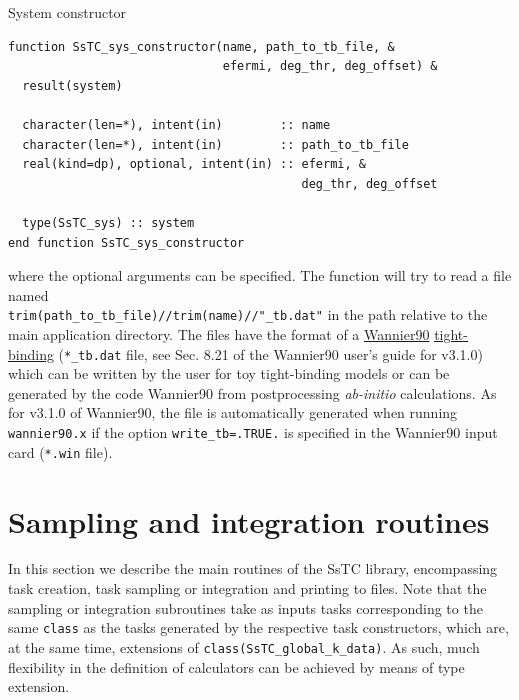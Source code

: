 \documentclass[10pt,a4paper]{article}
\begin{document}
\begin{codebox}{System constructor}
\begin{lstlisting}[caption={Interface of the system constructor.},captionpos=b]
function SsTC_sys_constructor(name, path_to_tb_file, &
                              efermi, deg_thr, deg_offset) &
  result(system)

  character(len=*), intent(in)        :: name
  character(len=*), intent(in)        :: path_to_tb_file
  real(kind=dp), optional, intent(in) :: efermi, &
                                         deg_thr, deg_offset

  type(SsTC_sys) :: system
end function SsTC_sys_constructor
\end{lstlisting}
\end{codebox}
where the optional arguments can be specified. The function will try to read a file named \\ \verb|trim(path_to_tb_file)//trim(name)//"_tb.dat"| in the path relative to the main application directory. The files have the format of a \href{https://wannier.org/}{Wannier90} \cite{pizziWannier90CommunityCode2020} \href{https://raw.githubusercontent.com/wannier-developers/wannier90/v3.1.0/doc/compiled_docs/user_guide.pdf}{tight-binding} (\verb|*_tb.dat| file, see Sec. 8.21 of the Wannier90 user's guide for v3.1.0) which can be written by the user for toy tight-binding models or can be generated by the code Wannier90 from postprocessing \textit{ab-initio} calculations. As for v3.1.0 of Wannier90, the file is automatically generated when running \verb|wannier90.x| if the option \verb|write_tb=.TRUE.| is specified in the Wannier90 input card (\verb|*.win| file).
\section{Sampling and integration routines}\label{sec: sampling_integration}
In this section we describe the main routines of the SsTC library, encompassing task creation, task sampling or integration and printing to files. Note that the sampling or integration subroutines take as inputs tasks corresponding to the same \verb|class| as the tasks generated by the respective task constructors, which are, at the same time, extensions of \verb|class(SsTC_global_k_data)|. As such, much flexibility in the definition of calculators can be achieved by means of type extension.
\end{document}
